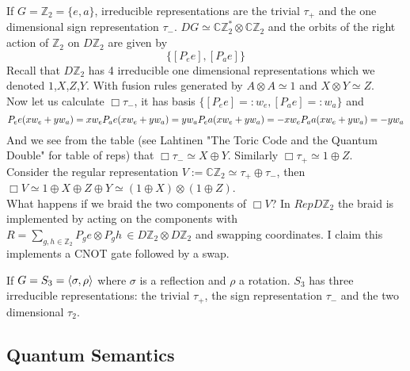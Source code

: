 \documentclass{article}
\newenvironment{example}[1][Example]{\begin{trivlist}
\item[\hskip \labelsep {\bfseries #1}]}{\end{trivlist}}
\begin{document}
\begin{example}
If $G=\mathbb{Z}_2= \{e,a\}$, irreducible representations are the trivial $\tau_+$ and the one dimensional sign representation $\tau_-$. $DG \simeq \mathbb{C}\mathbb{Z}_2^* \otimes \mathbb{C}\mathbb{Z}_2$ and the orbits of the right action of $\mathbb{Z}_2$ on $D\mathbb{Z}_2$ are given by
$$ \{ [P_ee], [P_ae] \}$$
Recall that $D\mathbb{Z}_2$ has 4 irreducible one dimensional representations which we denoted $1$,$X$,$Z$,$Y$. With fusion rules generated by $A \otimes A \simeq 1$ and $X \otimes Y \simeq Z$. \\
Now let us calculate $\Box \tau_-$, it has basis $\{[P_ee] =:w_e, [P_ae] =:w_a \}$ and 
\begin{equation*}
P_ee(xw_e + yw_a)= xw_e \\
P_ae(xw_e + yw_a)= yw_a \\
P_ea(xw_e + yw_a)= -xw_e \\ 
P_aa(xw_e + yw_a)= -yw_a
\end{equation*}
And we see from the table (see Lahtinen "The Toric Code and the Quantum Double" for table of reps) that $\Box \tau_- \simeq X \oplus Y$. Similarly $\Box \tau_+ \simeq 1 \oplus Z$. \\
Consider the regular representation $V := \mathbb{C}\mathbb{Z}_2 \simeq \tau_+ \oplus \tau_-$, then $\Box V \simeq 1 \oplus X \oplus Z \oplus Y \simeq (1 \oplus X) \otimes (1 \oplus Z) $.\\
What happens if we braid the two components of $\Box V$? In $RepD\mathbb{Z}_2$ the braid is implemented by acting on the components with $R=\sum_{g,h\in\mathbb{Z}_2} P_ge \otimes P_gh \, \in D\mathbb{Z}_2\otimes D\mathbb{Z}_2$ and swapping coordinates. I claim this implements a CNOT gate followed by a swap.
\end{example}

\begin{example}
If $G=S_3=\braket{\sigma,\rho}$ where $\sigma$ is a reflection and $\rho$ a rotation. $S_3$ has three irreducible representations: the trivial $\tau_+$, the sign representation $\tau_-$ and the two dimensional $\tau_2$.
\end{example}



\subsection{Quantum Semantics}
\end{document}
